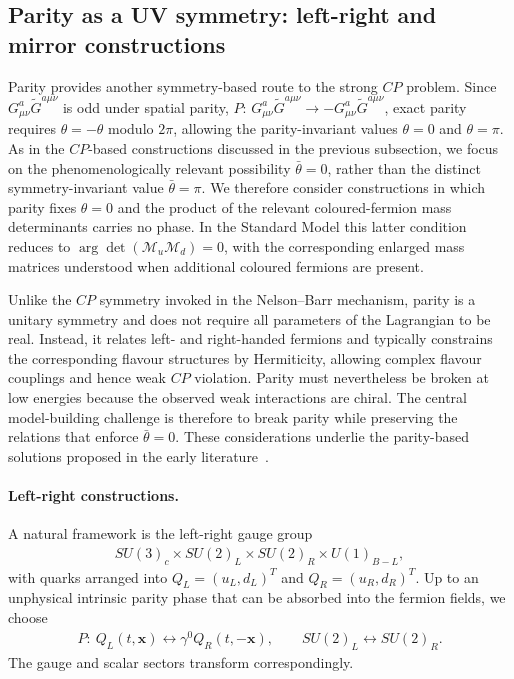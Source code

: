 \documentclass[review]{elsarticle}
\numberwithin{equation}{section}
\numberwithin{table}{section}
\numberwithin{figure}{section}
\def\M{\mathcal{M}}
\begin{document}
\subsection{Parity as a UV symmetry: left-right and mirror constructions}
\label{sec:parity}

Parity provides another symmetry-based route to the strong $CP$ problem. Since $G^a_{\mu\nu}\widetilde G^{a\mu\nu}$ is odd under spatial parity, $P:\,G^a_{\mu\nu}\widetilde G^{a\mu\nu}\rightarrow-G^a_{\mu\nu}\widetilde G^{a\mu\nu}$, exact parity requires $\theta=-\theta$ modulo $2\pi$, allowing the parity-invariant values $\theta=0$ and $\theta=\pi$. As in the $CP$-based constructions discussed in the previous subsection, we focus on the phenomenologically relevant possibility $\bar\theta=0$, rather than the distinct symmetry-invariant value $\bar\theta=\pi$. We therefore consider constructions in which parity fixes $\theta=0$ and the product of the relevant coloured-fermion mass determinants carries no phase. In the Standard Model this latter condition reduces to $\arg\det(\M_u\M_d)=0$, with the corresponding enlarged mass matrices understood when additional coloured fermions are present.

Unlike the $CP$ symmetry invoked in the Nelson--Barr mechanism, parity is a unitary symmetry and does not require all parameters of the Lagrangian to be real. Instead, it relates left- and right-handed fermions and typically constrains the corresponding flavour structures by Hermiticity, allowing complex flavour couplings and hence weak $CP$ violation. Parity must nevertheless be broken at low energies because the observed weak interactions are chiral. The central model-building challenge is therefore to break parity while preserving the relations that enforce $\bar\theta=0$. These considerations underlie the parity-based solutions proposed in the early literature~\cite{Mohapatra:1978fy,Babu:1988mw,Babu:1989rb,Barr:1991qx}.

\paragraph{Left-right constructions.}

A natural framework is the left-right gauge group
\begin{align}
    SU(3)_c \times SU(2)_L \times SU(2)_R \times U(1)_{B-L},
    \label{eq:LR-gauge-group}
\end{align}
with quarks arranged into $Q_L=(u_L,d_L)^T$ and $Q_R=(u_R,d_R)^T$. Up to an unphysical intrinsic parity phase that can be absorbed into the fermion fields, we choose
\begin{align}
    P:\ Q_L(t,\bm{x}) \leftrightarrow \gamma^0Q_R(t,-\bm{x}),
    \qquad
    SU(2)_L \leftrightarrow SU(2)_R.
    \label{eq:LR-parity}
\end{align}
The gauge and scalar sectors transform correspondingly.
\end{document}

